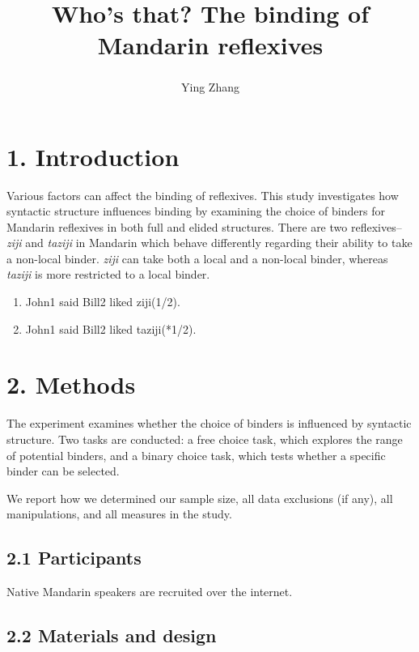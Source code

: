 \documentclass[
  man]{apa6}
\title{Who's that? The binding of Mandarin reflexives}
\author{Ying Zhang\textsuperscript{}}
\date{}
\affiliation{\vspace{0.5cm}\textsuperscript{1} Rutgers University}
\begin{document}
\maketitle

\section{1. Introduction}\label{introduction}

Various factors can affect the binding of reflexives. This study investigates how syntactic structure influences binding by examining the choice of binders for Mandarin reflexives in both full and elided structures. There are two reflexives-- \emph{ziji} and \emph{taziji} in Mandarin which behave differently regarding their ability to take a non-local binder. \emph{ziji} can take both a local and a non-local binder, whereas \emph{taziji} is more restricted to a local binder.

\begin{enumerate}
\def\labelenumi{(\arabic{enumi})}
\item
  John1 said Bill2 liked ziji(1/2).
\item
  John1 said Bill2 liked taziji(*1/2).
\end{enumerate}

\section{2. Methods}\label{methods}

The experiment examines whether the choice of binders is influenced by syntactic structure. Two tasks are conducted: a free choice task, which explores the range of potential binders, and a binary choice task, which tests whether a specific binder can be selected.

We report how we determined our sample size, all data exclusions (if any), all manipulations, and all measures in the study.

\subsection{2.1 Participants}\label{participants}

Native Mandarin speakers are recruited over the internet.

\subsection{2.2 Materials and design}\label{materials-and-design}
\end{document}
